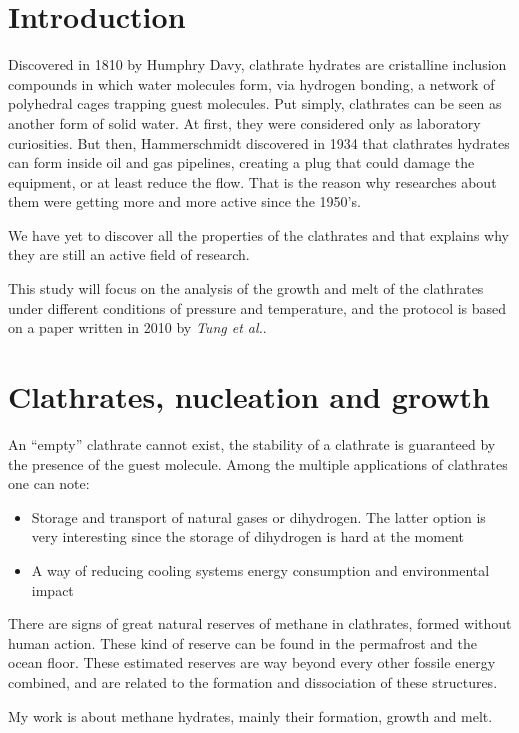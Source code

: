 \newpage
\section{Introduction}
Discovered in 1810 by Humphry Davy, clathrate hydrates are cristalline inclusion compounds in which water molecules form, via hydrogen bonding, a network of polyhedral cages trapping guest molecules. Put simply, clathrates can be seen as another form of solid water. At first, they were considered only as laboratory curiosities. But then, Hammerschmidt discovered in 1934 that clathrates hydrates can form inside oil and gas pipelines, creating a plug that could damage the equipment, or at least reduce the flow. That is the reason why researches about them were getting more and more active since the 1950's.

We have yet to discover all the properties of the clathrates and that explains why they are still an active field of research.

This study will focus on the analysis of the growth and melt of the clathrates under different conditions of pressure and temperature, and the protocol is based on a paper written in 2010 by \textit{Tung et al.}\cite{tung}.

\section{Clathrates, nucleation and growth}

An ``empty'' clathrate cannot exist, the stability of a clathrate is guaranteed by the presence of the guest molecule. Among the multiple applications of clathrates one can note:
\begin{itemize}
    \item Storage and transport of natural gases or dihydrogen. The latter option is very interesting since the storage of dihydrogen is hard at the moment
    \item A way of reducing cooling systems energy consumption and environmental impact
\end{itemize}

There are signs of great natural reserves of methane in clathrates, formed without human action. These kind of reserve can be found in the permafrost and the ocean floor. These estimated reserves are way beyond every other fossile energy combined, and are related to the formation and dissociation of these structures.

My work is about methane hydrates, mainly their formation, growth and melt.

